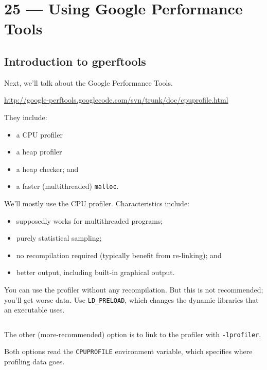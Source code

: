 \documentclass[a4paper]{report}
\begin{document}
\chapter*{25 --- Using Google Performance Tools}


\section*{Introduction to gperftools}
Next, we'll talk about the Google Performance Tools. 
\begin{center}
\url{http://google-perftools.googlecode.com/svn/trunk/doc/cpuprofile.html}
\end{center}
They include:
      \begin{itemize}
        \item a CPU profiler
        \item a heap profiler
        \item a heap checker; and 
        \item a faster (multithreaded) {\tt malloc}.
      \end{itemize}

We'll mostly use the CPU profiler. Characteristics include:
      \begin{itemize}
        \item  supposedly works for
multithreaded programs;
        \item purely statistical sampling;
        \item no recompilation required (typically benefit from re-linking); and
        \item better output, including built-in graphical output.
      \end{itemize}

You can use the profiler without any recompilation. But this is not recommended;
you'll get worse data. Use {\tt LD\_PRELOAD}, which changes the dynamic libraries that
an executable uses.

  \begin{lstlisting}[basicstyle=\scriptsize]
  % LD_PRELOAD="/usr/lib/libprofiler.so" CPUPROFILE=test.prof ./test
  \end{lstlisting}

The other (more-recommended) option is to link to the profiler with {\tt -lprofiler}.

Both options read the {\tt CPUPROFILE} environment variable, which
specifies where profiling data goes.
\end{document}
